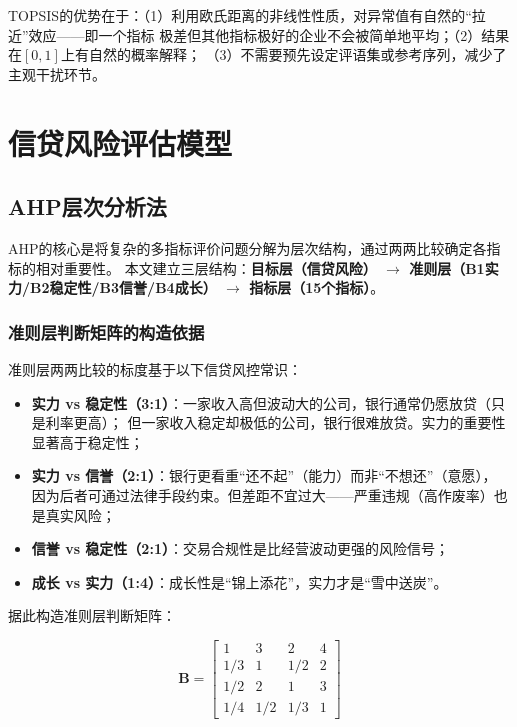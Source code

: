 \documentclass[12pt,a4paper]{ctexart}
\begin{document}
TOPSIS的优势在于：（1）利用欧氏距离的非线性性质，对异常值有自然的``拉近''效应——即一个指标
极差但其他指标极好的企业不会被简单地平均；（2）结果在$[0,1]$上有自然的概率解释；
（3）不需要预先设定评语集或参考序列，减少了主观干扰环节。

\section{信贷风险评估模型}

\subsection{AHP层次分析法}

AHP的核心是将复杂的多指标评价问题分解为层次结构，通过两两比较确定各指标的相对重要性。
本文建立三层结构：\textbf{目标层（信贷风险） $\to$ 准则层（B1实力/B2稳定性/B3信誉/B4成长）
$\to$ 指标层（15个指标）}。

\subsubsection{准则层判断矩阵的构造依据}

准则层两两比较的标度基于以下信贷风控常识：
\begin{itemize}
    \item \textbf{实力 vs 稳定性（3:1）}：一家收入高但波动大的公司，银行通常仍愿放贷（只是利率更高）；
          但一家收入稳定却极低的公司，银行很难放贷。实力的重要性显著高于稳定性；
    \item \textbf{实力 vs 信誉（2:1）}：银行更看重``还不起''（能力）而非``不想还''（意愿），
          因为后者可通过法律手段约束。但差距不宜过大——严重违规（高作废率）也是真实风险；
    \item \textbf{信誉 vs 稳定性（2:1）}：交易合规性是比经营波动更强的风险信号；
    \item \textbf{成长 vs 实力（1:4）}：成长性是``锦上添花''，实力才是``雪中送炭''。
\end{itemize}

据此构造准则层判断矩阵：

\begin{equation}
\mathbf{B} = \begin{bmatrix}
1   & 3   & 2   & 4 \\
1/3 & 1   & 1/2 & 2 \\
1/2 & 2   & 1   & 3 \\
1/4 & 1/2 & 1/3 & 1
\end{bmatrix}
\end{equation}
\end{document}
